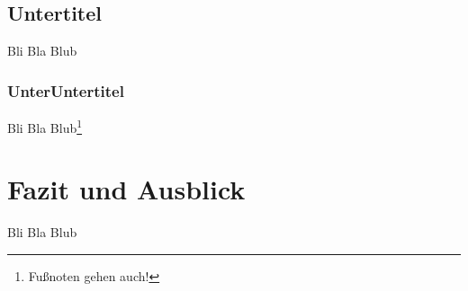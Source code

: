 \documentclass[
	ngerman, 
	fontsize=9pt,
	accentcolor=1b,%
	type=intern,
	marginpar=false,
	]{tudapub}
\begin{document}
\subsection{Untertitel}
\begin{changemargin}{0.5cm}{0.5cm}

Bli Bla Blub \citep{jorkeGrosseDemokratieUber2019}

\end{changemargin}

\subsubsection{UnterUntertitel}
\begin{changemargin}{0.5cm}{0.5cm}

Bli Bla Blub\footnote{Fußnoten gehen auch!}

\end{changemargin}


\section{Fazit und Ausblick}
\begin{changemargin}{0.5cm}{0.5cm}

Bli Bla Blub

\end{changemargin}


\end{document}
